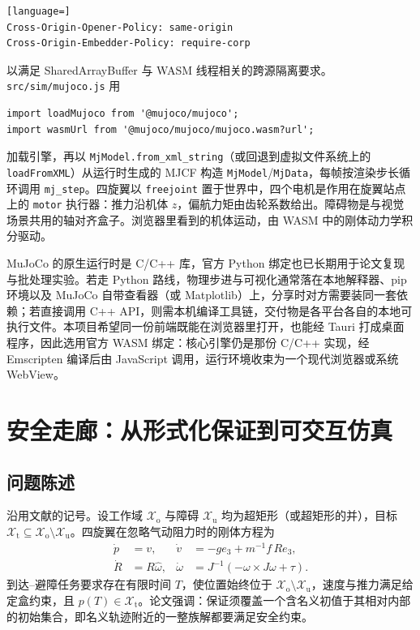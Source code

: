 \documentclass[UTF8,a4paper,11pt,zihao=-4]{ctexart}
\begin{document}
\begin{lstlisting}[language=]
Cross-Origin-Opener-Policy: same-origin
Cross-Origin-Embedder-Policy: require-corp
\end{lstlisting}

以满足 SharedArrayBuffer 与 WASM 线程相关的跨源隔离要求。\texttt{src/sim/mujoco.js} 用

\begin{lstlisting}[language=JS]
import loadMujoco from '@mujoco/mujoco';
import wasmUrl from '@mujoco/mujoco/mujoco.wasm?url';
\end{lstlisting}

加载引擎，再以 \texttt{MjModel.from\_xml\_string}（或回退到虚拟文件系统上的 \texttt{loadFromXML}）从运行时生成的 MJCF 构造 \texttt{MjModel}/\texttt{MjData}，每帧按渲染步长循环调用 \texttt{mj\_step}。四旋翼以 \texttt{freejoint} 置于世界中，四个电机是作用在旋翼站点上的 \texttt{motor} 执行器：推力沿机体 $z$，偏航力矩由齿轮系数给出。障碍物是与视觉场景共用的轴对齐盒子。浏览器里看到的机体运动，由 WASM 中的刚体动力学积分驱动。

MuJoCo 的原生运行时是 C/C++ 库，官方 Python 绑定也已长期用于论文复现与批处理实验。若走 Python 路线，物理步进与可视化通常落在本地解释器、pip 环境以及 MuJoCo 自带查看器（或 Matplotlib）上，分享时对方需要装同一套依赖；若直接调用 C++ API，则需本机编译工具链，交付物是各平台各自的本地可执行文件。本项目希望同一份前端既能在浏览器里打开，也能经 Tauri 打成桌面程序，因此选用官方 WASM 绑定：核心引擎仍是那份 C/C++ 实现，经 Emscripten 编译后由 JavaScript 调用，运行环境收束为一个现代浏览器或系统 WebView。

\section{安全走廊：从形式化保证到可交互仿真}
\label{sec:method}

\subsection{问题陈述}

沿用文献\cite{serry2026reachavoid}的记号。设工作域 $\mathcal{X}_{\mathrm{o}}$ 与障碍 $\mathcal{X}_{\mathrm{u}}$ 均为超矩形（或超矩形的并），目标 $\mathcal{X}_{\mathrm{t}}\subseteq\mathcal{X}_{\mathrm{o}}\setminus\mathcal{X}_{\mathrm{u}}$。四旋翼在忽略气动阻力时的刚体方程为
\begin{align}
\dot{p}&=v, &
\dot{v}&=-ge_3+m^{-1}f\,R e_3, \\
\dot{R}&=R\hat{\omega}, &
\dot{\omega}&=J^{-1}(-\omega\times J\omega+\tau).
\end{align}
到达--避障任务要求存在有限时间 $T$，使位置始终位于 $\mathcal{X}_{\mathrm{o}}\setminus\mathcal{X}_{\mathrm{u}}$，速度与推力满足给定盒约束，且 $p(T)\in\mathcal{X}_{\mathrm{t}}$。论文强调：保证须覆盖一个含名义初值于其相对内部的初始集合，即名义轨迹附近的一整族解都要满足安全约束。
\end{document}
